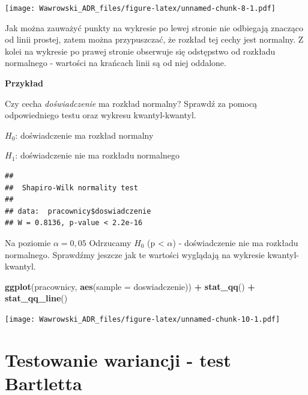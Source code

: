 \documentclass[
]{book}
\newenvironment{Shaded}{\begin{snugshade}}{\end{snugshade}}
\newcommand{\DataTypeTok}[1]{\textcolor[rgb]{0.13,0.29,0.53}{#1}}
\newcommand{\KeywordTok}[1]{\textcolor[rgb]{0.13,0.29,0.53}{\textbf{#1}}}
\newcommand{\NormalTok}[1]{#1}
\newcommand{\OperatorTok}[1]{\textcolor[rgb]{0.81,0.36,0.00}{\textbf{#1}}}
\newcommand{\StringTok}[1]{\textcolor[rgb]{0.31,0.60,0.02}{#1}}
\begin{document}
\texttt{[image: Wawrowski\_ADR\_files/figure-latex/unnamed-chunk-8-1.pdf]}

Jak można zauważyć punkty na wykresie po lewej stronie nie odbiegają znacząco od linii prostej, zatem można przypuszczać, że rozkład tej cechy jest normalny. Z kolei na wykresie po prawej stronie obserwuje się odstępstwo od rozkładu normalnego - wartości na krańcach linii są od niej oddalone.

\textbf{Przykład}

Czy cecha \emph{doświadczenie} ma rozkład normalny? Sprawdź za pomocą odpowiedniego testu oraz wykresu kwantyl-kwantyl.

\(H_0\): doświadczenie ma rozkład normalny

\(H_1\): doświadczenie nie ma rozkładu normalnego

\begin{Shaded}
\end{Shaded}

\begin{verbatim}
## 
##  Shapiro-Wilk normality test
## 
## data:  pracownicy$doswiadczenie
## W = 0.8136, p-value < 2.2e-16
\end{verbatim}

Na poziomie \(\alpha = 0,05\) Odrzucamy \(H_0\) (p \textless{} \(\alpha\)) - doświadczenie nie ma rozkładu normalnego. Sprawdźmy jeszcze jak te wartości wyglądają na wykresie kwantyl-kwantyl.

\begin{Shaded}
\begin{Highlighting}[]
\KeywordTok{ggplot}\NormalTok{(pracownicy, }\KeywordTok{aes}\NormalTok{(}\DataTypeTok{sample =}\NormalTok{ doswiadczenie)) }\OperatorTok{+}
\StringTok{  }\KeywordTok{stat_qq}\NormalTok{() }\OperatorTok{+}
\StringTok{  }\KeywordTok{stat_qq_line}\NormalTok{()}
\end{Highlighting}
\end{Shaded}

\texttt{[image: Wawrowski\_ADR\_files/figure-latex/unnamed-chunk-10-1.pdf]}

\hypertarget{testowanie-wariancji---test-bartletta}{%
\section{Testowanie wariancji - test Bartletta}\label{testowanie-wariancji---test-bartletta}}
\end{document}
